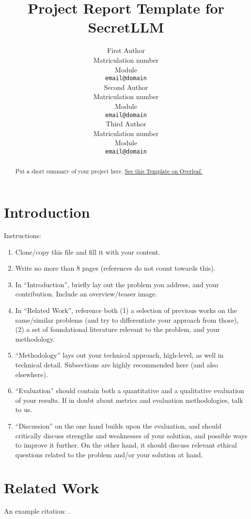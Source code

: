 \documentclass[11pt]{article}
\title{Project Report Template for SecretLLM}
\author{First Author \\
  Matriculation number\\
  Module \\
  \texttt{email@domain} 
  \\\And
  Second Author \\
  Matriculation number\\
  Module \\
  \texttt{email@domain}
  \\\And
  Third Author \\
  Matriculation number\\
  Module \\
  \texttt{email@domain}  
  \\}
\begin{document}
\maketitle
\begin{abstract}
Put a short summary of your project here.
\href{https://www.overleaf.com/project/67469c50cdaee20b5e17b6e9}{See this Template on Overleaf.}
\end{abstract}

\section{Introduction}

Instructions: 
\begin{enumerate}
    \item Clone/copy this file and fill it with your content.
    \item Write no more than 8 pages (references do not count towards this).
    \item In ``Introduction'', briefly lay out the problem you address, and your contribution. Include an overview/teaser image.
    \item In ``Related Work'', reference both (1) a selection of previous works on the same/similar problems (and try to differentiate your approach from those), (2) a set of foundational literature relevant to the problem, and your methodology.
    \item ``Methodology'' lays out your technical approach, high-level, as well in technical detail. Subsections are highly recommended here (and also elsewhere).
    \item ``Evaluation'' should contain both a quantitative and a qualitative evaluation of your results. If in doubt about metrics and evaluation methodologies, talk to us.
    \item ``Discussion'' on the one hand builds upon the evaluation, and should critically discuss strengths and weaknesses of your solution, and possible ways to improve it further. On the other hand, it should discuss relevant ethical questions related to the problem and/or your solution at hand.
\end{enumerate}




\section{Related Work}

An example citation: \cite{dijkstra1968goto}.
\end{document}
